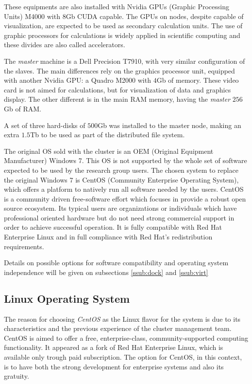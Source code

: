\documentclass[twoside,a4paper,12pt,english]{inac17}
\begin{document}
These equipments are also installed with Nvidia{\textregistered} GPUs (Graphic Processing Units) M4000{\textregistered} with $8$Gb CUDA\cite{CUDA} capable.
The GPUs on nodes, despite capable of visualization, are expected to be used as secondary calculation units.
The use of graphic processors for calculations is widely applied in scientific computing and these divides
are also called accelerators\cite{accelerators}.

The \textit{master} machine is a Dell Precision T7910, with very similar configuration of the slaves. The main
differences rely on the graphics processor unit, equipped with another Nvidia{\textregistered} GPU: a
Quadro{\textregistered} M2000 with $4$Gb of memory. These video card is not aimed for calculations, but for
visualization of data and graphics display. The other different is in the main RAM memory, having the \textit{master}
$256$Gb of RAM. 

A set of three hard-disks of $500$Gb was installed to the master node, making an extra $1.5$Tb to be used as part
of the distributed file system.

The original OS sold with the cluster is an OEM (Original Equipment Manufacturer) Windows 7{\textregistered}\cite{windows7}. This
OS is not supported by the whole set of software expected to be used by the research group users. The chosen
system to replace the original Windows 7 is CentOS (Community Enterprise Operating System)\cite{centos}, which offers a platform to natively run all
software needed by the users. CentOS is a community driven free-software effort which focuses in provide a robust open source ecosystem.
Its typical users are organizations or individuals which have professional oriented hardware but do not need strong commercial support
in order to achieve successful operation. It is fully compatible with Red Hat Enterprise Linux and in full compliance with Red Hat's
redistribution requirements.

Details on possible options for software compatibility and operating system independence will be given on subsections \ref{ssub:dock} and \ref{ssub:virt}

\subsection{Linux Operating System}

The reason for choosing \textit{CentOS} as the Linux flavor for the system is due to its characteristics and the previous
experience of the cluster management team. CentOS is aimed to offer a free, enterprise-class, community-supported computing
functionality. It appeared as a fork of Red Hat Enterprise Linux, which is available only trough paid subscription. The option
for CentOS, in this context, is to have both the strong development for enterprise systems and also its gratuity.
\end{document}
